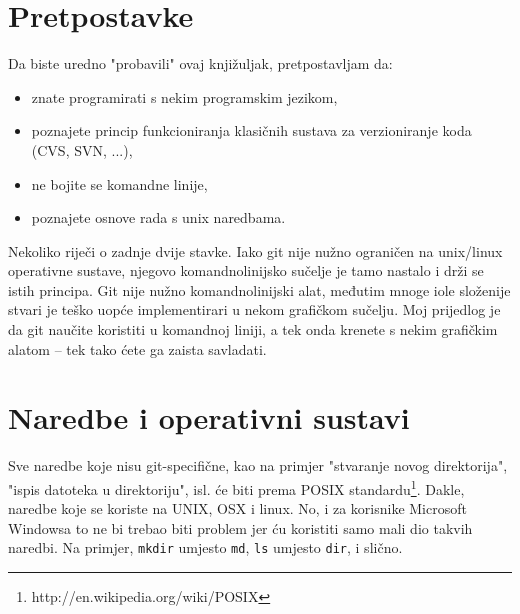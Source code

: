 \section*{Pretpostavke}

Da biste uredno "probavili" ovaj knjižuljak, pretpostavljam da:

\begin{itemize}
	\item znate programirati s nekim programskim jezikom,
	\item poznajete princip funkcioniranja klasičnih sustava za verzioniranje koda (CVS, SVN, ...),
	\item ne bojite se komandne linije,
	\item poznajete osnove rada s unix naredbama.
\end{itemize}

Nekoliko riječi o zadnje dvije stavke.
Iako git nije nužno ograničen na unix/linux operativne sustave, njegovo komandnolinijsko sučelje je tamo nastalo i drži se istih principa.
Git nije nužno komandnolinijski alat, međutim mnoge iole složenije stvari je teško uopće implementirari u nekom grafičkom sučelju. 
Moj prijedlog je da git naučite koristiti u komandnoj liniji, a tek onda krenete s nekim grafičkim alatom -- tek tako ćete ga zaista savladati.

\section*{Naredbe i operativni sustavi}

Sve naredbe koje nisu git-specifične, kao na primjer "stvaranje novog direktorija", "ispis datoteka u direktoriju", isl. će biti prema POSIX standardu\footnote{http://en.wikipedia.org/wiki/POSIX}.
Dakle, naredbe koje se koriste na UNIX, OSX i linux. 
No, i za korisnike Microsoft Windowsa to ne bi trebao biti problem jer ću koristiti samo mali dio takvih naredbi. 
Na primjer, \verb+mkdir+ umjesto \verb+md+, \verb+ls+ umjesto \verb+dir+, i slično.
